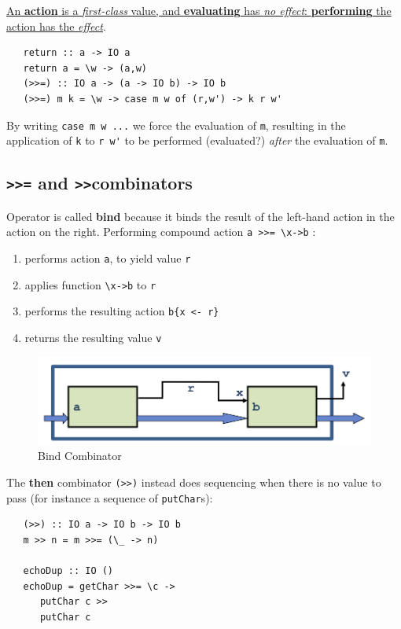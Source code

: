 \ul{An \textbf{action} is a \textit{first-class} value,
and \textbf{evaluating} has \textit{no effect}: \textbf{performing} the
action has the \textit{effect}}.

\begin{lstlisting}
   return :: a -> IO a
   return a = \w -> (a,w)
   (>>=) :: IO a -> (a -> IO b) -> IO b
   (>>=) m k = \w -> case m w of (r,w') -> k r w'
\end{lstlisting}

By writing \lstinline|case m w ...| we force the evaluation of \lstinline|m|,
resulting in the application of \lstinline|k| to \lstinline|r w'| to be performed (evaluated?) \textit{after} the evaluation of \lstinline|m|.  

\subsection{\texttt{>>=} and \texttt{>>}combinators}
Operator is called \textbf{bind} because it binds the result
of the left-hand action in the action on the right.
Performing compound action \lstinline|a >>= \x->b| :
\begin{enumerate}
   \item performs action \lstinline|a|, to yield value \lstinline|r|
   \item applies function \lstinline|\x->b| to \lstinline|r|
   \item performs the resulting action \lstinline|b{x <- r}|
   \item returns the resulting value \lstinline|v|
\end{enumerate}

\begin{figure}[htbp]
   \centering
   \includegraphics{images/bind_combinator.png}
   \caption{Bind Combinator}
   \label{fig:bind_combinator}
\end{figure}

The \textbf{then} combinator \lstinline|(>>)| instead does sequencing when there is no value to pass (for instance a sequence of \lstinline|putChar|s):
\begin{lstlisting}
   (>>) :: IO a -> IO b -> IO b
   m >> n = m >>= (\_ -> n)

   echoDup :: IO ()
   echoDup = getChar >>= \c ->
      putChar c >>
      putChar c
\end{lstlisting}


